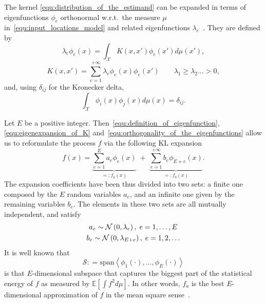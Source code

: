 \documentclass[10pt,twocolumn,twoside]{IEEEtran}					%
\theoremstyle	{plain}
\newcommand{\DefinedAs}			[0]	{\mathrel{\mathop:}=}
\newcommand{\IDefinedAs}		[0]	{=\mathrel{\mathop:}}
\newcommand{\GaussianDistribution}					[2]	{\mathcal{N} \left( #1, #2 \right)}
\newcommand{\SpanOf}								[1]	{\textrm{span} \left\langle #1 \right\rangle}
\newcommand{\Expectation}					[0]	{\mathbb{E}}
\newcommand{\ExpectationOf}					[1]	{\Expectation \left[ #1 \right]}
\begin{document}
The kernel \eqref{equ:distribution_of_the_estimand} can be expanded in terms of eigenfunctions $\phi_{e}$ orthonormal w.r.t.\ the measure $\mu$ in~\eqref{equ:input_locations_model} and related eigenfunctions $\lambda_{e}$~\cite{levy2008karhunen}. They are defined by
%
\begin{equation}
	\lambda_{e} \phi_{e} (x) = \int_{\mathcal{X}} K(x,x') \phi_{e} (x') d\mu(x'), 
	\label{equ:definition_of_eigenfunction}
\end{equation}
%
\begin{equation}
	K(x,x') = \sum_{e = 1}^{+\infty} \lambda_{e} \phi_{e}(x) \phi_{e}(x')
	\qquad
	\lambda_1 \geq \lambda_2 \ldots > 0,
	\label{equ:eigenexpansion_of_K}
\end{equation}
%
and, using $\delta_{ij}$ for the Kronecker delta,
%
\begin{equation}
	\int_{\mathcal{X}} \phi_{i}(x) \phi_{j}(x) d \mu(x) = \delta_{ij}. 
	\label{equ:orthogonality_of_the_eigenfunctions}
\end{equation}

Let $E$ be a positive integer. Then~\eqref{equ:definition_of_eigenfunction}, \eqref{equ:eigenexpansion_of_K} and~\eqref{equ:orthogonality_of_the_eigenfunctions} allow us to reformulate the process $f$ via the following \ac{KL} expansion
%
\begin{equation}
	f(x)
	=
	\underbrace{\sum_{e = 1}^{E} a_{e} \phi_{e}(x)}_{\IDefinedAs \displaystyle f_{a}(x)}
	\; + \;
	\underbrace{\sum_{e = 1}^{+\infty} b_{e} \phi_{E+e}(x)}_{\IDefinedAs \displaystyle f_{b}(x)} .
	\label{equ:estimand_model}
\end{equation}
%
The expansion coefficients have been thus divided into two sets: a finite one composed by the $E$ random variables $a_e$, and an infinite one given by the remaining variables $b_e$. The elements in these two sets are all mutually independent, and satisfy
%
\begin{subequations}{\label{equ:coefficients_are_gaussianly_distributed}}
	\noeqref{equ:coefficients_are_gaussianly_distributed,equ:coefficients_are_gaussianly_distributed:a,equ:coefficients_are_gaussianly_distributed:b}
	\begin{gather}
		a_{e} \sim \GaussianDistribution{0}{\lambda_{e}}, \; e = 1, \ldots, E 
		\label{equ:coefficients_are_gaussianly_distributed:a} \\
		b_{e} \sim \GaussianDistribution{0}{\lambda_{E+e}}, \; e = 1, 2, \ldots
		\label{equ:coefficients_are_gaussianly_distributed:b} \\
	\end{gather}
\end{subequations}
%
It is well known that
%
\begin{equation}
	\mathcal{S}
	\DefinedAs
	\SpanOf{ \phi_{1}(\cdot), \ldots, \phi_{E}(\cdot) }
	\label{equ:definition_of_mathcal_S}
\end{equation}
%
is that $E$-dimensional subspace that captures the biggest part of the statistical energy of $f$ as measured by $\ExpectationOf{\int f^2 d\mu}$. In other words, $f_{a}$ is the best $E$-dimensional approximation of $f$ in the mean square sense~\cite{zhu_et_al__1998__gaussian_regression_and_optimal_finite_dimensional_linear_models}.
\end{document}
